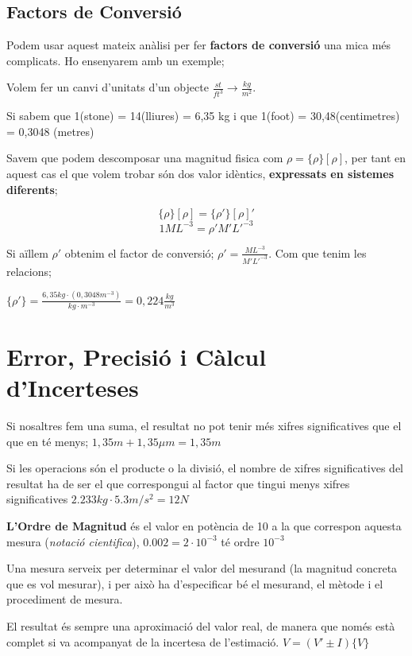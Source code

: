 \documentclass[12pt]{article}
\begin{document}
\subsection{Factors de Conversió}

Podem usar aquest mateix anàlisi per fer \textbf{factors de conversió} una mica més complicats. Ho ensenyarem amb un exemple;

\begin{examplebox}{}
    Volem fer un canvi d'unitats d'un objecte $\frac{st}{ft^3} \rightarrow \frac{kg}{m^2}$.

    Si sabem que 1(stone) = 14(lliures) = 6,35 kg i que 1(foot) = 30,48(centimetres) = 0,3048 (metres)

    Savem que podem descomposar una magnitud fisica com $\rho = \{\rho\}[\rho]$, per tant en aquest cas el que volem trobar són dos valor idèntics, \textbf{expressats en sistemes diferents};

    \[\{\rho\}[\rho] = \{\rho'\}[\rho]'\]
    \[1 ML^{-3} = {\rho'}M'L'^{-3}\]

    Si aïllem $\rho'$ obtenim el factor de conversió; $\rho' = \frac{ML^{-3}}{M'L'^{-3}}$. Com que tenim les relacions;

    $\{\rho'\} = \frac{6,35kg \cdot(0,3048m^{-3})}{kg \cdot m^{-3}} = 0,224 \frac{kg}{m^3}$
\end{examplebox}

\section{Error, Precisió i Càlcul d'Incerteses}

Si nosaltres fem una suma, el resultat no pot tenir més xifres significatives que el que en té menys; $1,35m + 1,35\mu m = 1,35 m$

Si les operacions són el producte o la divisió, el nombre de xifres significatives del resultat ha de ser el que correspongui al factor que tingui menys xifres significatives $2.233 kg \cdot 5.3m/s^2 = 12N$

\textbf{L'Ordre de Magnitud} és el valor en potència de 10 a la que correspon aquesta mesura (\textit{notació cientifica}), $0.002 = 2\cdot 10^{-3}$ té ordre $10^{-3}$

Una mesura serveix per determinar el valor del mesurand (la magnitud concreta que es vol mesurar), i per això ha d’especificar bé el mesurand, el mètode i el procediment de mesura.

El resultat és sempre una aproximació del valor real, de manera que només està complet si va acompanyat de la incertesa de l’estimació. $V = (V' \pm I)\{V\}$
\end{document}
